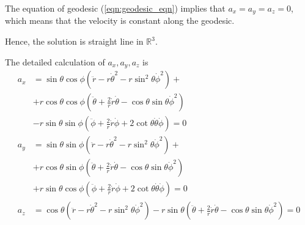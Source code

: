 \documentclass[a4paper,11pt]{article}
\begin{document}
The equation of geodesic (\ref{eqn:geodesic_eqn}) implies that $a_x = a_y = a_z = 0$, which means that the velocity is constant along the geodesic.

Hence, the solution is straight line in $\mathbb{R}^3$. 

The detailed calculation of $a_x, a_y, a_z$ is
\begin{align}
    a_x &= \sin\theta\cos\phi(\ddot{r} - r\dot{\theta}^2 - r\sin^2\theta \dot{\phi}^2) + \\
    & + r\cos\theta\cos\phi(\ddot{\theta}+\frac{2}{r}\dot{r}\dot{\theta}-\cos\theta\sin\theta \dot{\phi}^2) \\
    & - r\sin\theta\sin\phi(\ddot{\phi} + \frac{2}{r}\dot{r}\dot{\phi} + 2\cot\theta \dot{\theta}\dot{\phi}) = 0\\
    a_y &= \sin\theta\sin\phi(\ddot{r} - r\dot{\theta}^2 - r\sin^2\theta \dot{\phi}^2) + \\
    & + r\cos\theta\sin\phi(\ddot{\theta}+\frac{2}{r}\dot{r}\dot{\theta}-\cos\theta\sin\theta \dot{\phi}^2) \\
    & + r\sin\theta\cos\phi(\ddot{\phi} + \frac{2}{r}\dot{r}\dot{\phi} + 2\cot\theta \dot{\theta}\dot{\phi}) = 0\\
    a_z &= \cos\theta(\ddot{r} - r\dot{\theta}^2 - r\sin^2\theta \dot{\phi}^2) - r\sin\theta(\ddot{\theta}+\frac{2}{r}\dot{r}\dot{\theta}-\cos\theta\sin\theta \dot{\phi}^2) = 0
\end{align}
\end{document}
